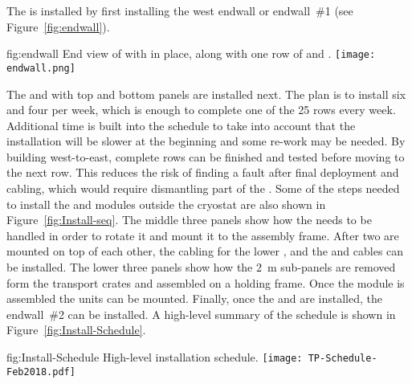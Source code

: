 The   is installed by first installing the west endwall or
endwall~\#1 (see Figure~\ref{fig:endwall}).

\begin{dunefigure}{fig:endwall}
  {End view of  with  in
  place, along with one row of  and .}
\texttt{[image: endwall.png]}
\end{dunefigure}

The  and  with top and bottom  panels are
installed next. The plan is to install six  and four
 per week, which is enough to complete one of the \num{25}
rows every week. Additional time is built into the schedule to take
into account that the installation will be slower at the beginning and
some re-work may be needed. By building west-to-east, complete rows can
be finished and tested before moving to the next row. This reduces the
risk of finding a fault after final  deployment and cabling,
which would require dismantling part of the . Some of the steps
needed to install the  and  modules outside the
cryostat are also shown in Figure~\ref{fig:Install-seq}.  The middle three
panels show how the  needs to be handled in order to rotate
it and mount it to the assembly frame. After two  are
mounted on top of each other, the cabling for the lower , and the
 and  cables can be installed. The
lower three panels show how the \SI{2}{m}  sub-panels are
removed form the transport crates and assembled on a holding frame. Once
the  module is assembled the  units can be
mounted. Finally, once the  and  are installed,
the endwall~\#2 can be installed. A high-level summary of the schedule
is shown in Figure~\ref{fig:Install-Schedule}.

\begin{dunefigure}{fig:Install-Schedule}
  {High-level installation schedule.}
 \texttt{[image: TP-Schedule-Feb2018.pdf]}
\end{dunefigure}


